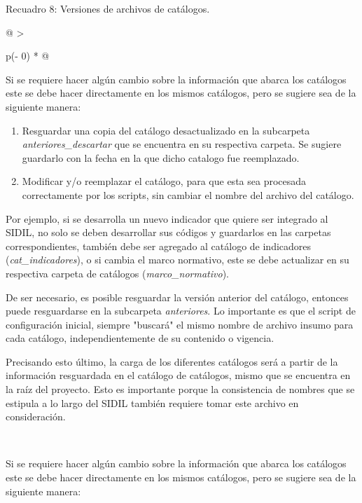 \documentclass[
]{article}
\begin{document}
Recuadro 8: Versiones de archivos de catálogos.

\begin{longtable}[]{@{}
  >{\raggedright\arraybackslash}p{(\columnwidth - 0\tabcolsep) * }@{}}
\caption{La Matriz de Predicción de Riesgo}\tabularnewline
\toprule\noalign{}
\begin{minipage}[b]{\linewidth}\raggedright
Si se requiere hacer algún cambio sobre la información que abarca los catálogos este se debe hacer directamente en los mismos catálogos, pero se sugiere sea de la siguiente manera:

\begin{enumerate}
\def\labelenumi{\arabic{enumi})}
\item
  Resguardar una copia del catálogo desactualizado en la subcarpeta \emph{anteriores\_descartar} que se encuentra en su respectiva carpeta. Se sugiere guardarlo con la fecha en la que dicho catalogo fue reemplazado.
\item
  Modificar y/o reemplazar el catálogo, para que esta sea procesada correctamente por los scripts, sin cambiar el nombre del archivo del catálogo.
\end{enumerate}

Por ejemplo, si se desarrolla un nuevo indicador que quiere ser integrado al SIDIL, no solo se deben desarrollar sus códigos y guardarlos en las carpetas correspondientes, también debe ser agregado al catálogo de indicadores (\emph{cat\_indicadores}), o si cambia el marco normativo, este se debe actualizar en su respectiva carpeta de catálogos (\emph{marco\_normativo}).

De ser necesario, es posible resguardar la versión anterior del catálogo, entonces puede resguardarse en la subcarpeta \emph{anteriores}. Lo importante es que el script de configuración inicial, siempre "buscará" el mismo nombre de archivo insumo para cada catálogo, independientemente de su contenido o vigencia.

Precisando esto último, la carga de los diferentes catálogos será a partir de la información resguardada en el catálogo de catálogos, mismo que se encuentra en la raíz del proyecto. Esto es importante porque la consistencia de nombres que se estipula a lo largo del SIDIL también requiere tomar este archivo en consideración.
\end{minipage} \\
\midrule\noalign{}
\endfirsthead
\toprule\noalign{}
\begin{minipage}[b]{\linewidth}\raggedright
Si se requiere hacer algún cambio sobre la información que abarca los catálogos este se debe hacer directamente en los mismos catálogos, pero se sugiere sea de la siguiente manera:


\end{minipage}
\end{longtable}
\end{document}
